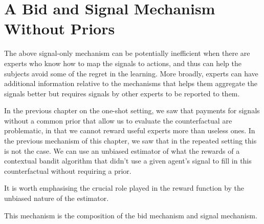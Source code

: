 	




\section{A Bid and Signal Mechanism Without Priors}



The above signal-only mechanism can be potentially inefficient when there are experts who know how to map the signals to actions, and thus can help the subjects avoid some of the regret in the learning.
More broadly, experts can have additional information relative to the mechanisms that helps them aggregate the signals better but requires signals by other experts to be reported to them. 

In the previous chapter on the one-shot setting, we saw that payments for signals without a common prior that allow us to evaluate the counterfactual are problematic, in that we cannot reward useful experts more than useless ones. In the previous mechanism of this chapter, we saw that in the repeated setting this is not the case. We can use an unbiased estimator of what the rewards of a contextual bandit algorithm that didn't use a given agent's signal to fill in this counterfactual without requiring a prior.

It is worth emphasising the crucial role played in the reward function by the unbiased nature of the estimator.

This mechanism is the composition of the bid mechanism and signal mechanism.


